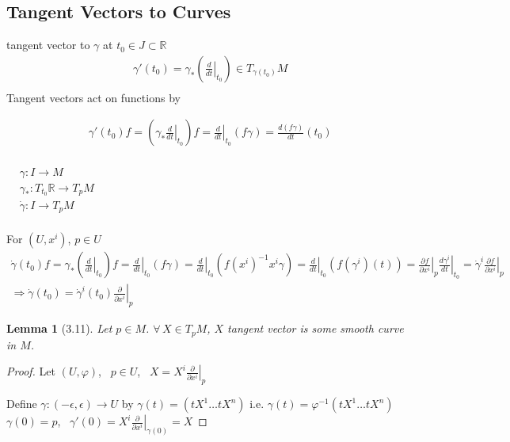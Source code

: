 \documentclass[11pt]{amsart}
\newtheorem{lemma}{Lemma}
\theoremstyle{definition}
\begin{document}
\subsection*{ Tangent Vectors to Curves}

tangent vector to $\gamma$ at $t_0 \in J \subset \mathbb{R}$
\[
\begin{aligned}
  & \gamma'(t_0) = \gamma_* \left( \left. \frac{d}{dt} \right|_{t_0} \right) \in T_{\gamma(t_0)}M \\
\end{aligned}
\]
Tangent vectors act on functions by

\[
\begin{aligned}
  & \gamma'(t_0) f = \left( \left. \gamma_*  \frac{d}{dt} \right|_{t_0} \right) f = \left. \frac{d}{dt} \right|_{t_0}(f\gamma) = \frac{d(f\gamma)}{ dt}(t_0)
\end{aligned}
\]


$\begin{aligned}
  & \quad \\
  & \gamma : I \to M \\
  & \gamma_* : T_{t_0} \mathbb{R} \to T_p M \\
  & \dot{\gamma} : I \to T_p M \\
\end{aligned}$



For $(U,x^i)$, $p\in U$
\[
\begin{gathered}
\dot{\gamma}(t_0) f = \gamma_* \left( \left. \frac{d}{dt}  \right|_{t_0} \right) f = \left. \frac{d}{dt} \right|_{t_0} (f\gamma) = \left. \frac{d}{dt} \right|_{t_0} (f (x^i)^{-1} x^i \gamma ) = \left. \frac{d}{dt} \right|_{t_0} ( f( \gamma^i)(t) )  =  \left. \frac{ \partial f}{  \partial x^i } \right|_p \left. \frac{ d \gamma^i }{ dt} \right|_{t_0} = \dot{\gamma}^i \left. \frac{ \partial f}{ \partial x^i } \right|_p  \\
\Longrightarrow \dot{ \gamma}(t_0) = \left. \dot{\gamma}^i(t_0) \frac{ \partial}{ \partial x^i} \right|_p
\end{gathered}
\]


\begin{lemma}[3.11] Let $p\in M$.  $\forall \, X \in T_p M$, $X$ tangent vector is some smooth curve in $M$. \end{lemma}

\begin{proof}
Let $(U,\varphi)$, \, $p \in U$, \, $X = X^i \left. \frac{ \partial }{ \partial x^i} \right|_p$

Define $\gamma: (-\epsilon, \epsilon) \to U$ by $\gamma(t) = (tX^1 \dots tX^n)$ i.e. $\gamma(t) = \varphi^{-1}(t X^1 \dots tX^n)$  \\
$\gamma(0) = p$,  \, $\gamma'(0) = X^i \left. \frac{ \partial }{ \partial x^i} \right|_{\gamma(0)} = X$


\end{proof}
\end{document}
